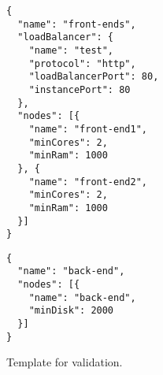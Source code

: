 \begin{figure}
  \begin{center}
    \begin{verbatim}
{
  "name": "front-ends",
  "loadBalancer": {
    "name": "test",
    "protocol": "http",
    "loadBalancerPort": 80,
    "instancePort": 80
  },
  "nodes": [{   
    "name": "front-end1",
    "minCores": 2,
    "minRam": 1000
  }, {   
    "name": "front-end2",
    "minCores": 2,
    "minRam": 1000
  }]
}
    \end{verbatim}
    \begin{verbatim}
{
  "name": "back-end",
  "nodes": [{   
    "name": "back-end",
    "minDisk": 2000
  }]
}
    \end{verbatim}
  \end{center}
  \caption{Template for validation.}
  \label{list:validation-threenodes}
\end{figure}

